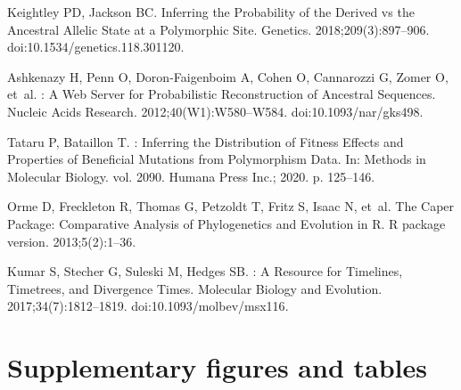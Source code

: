 \documentclass{article}
\begin{document}
\begin{thebibliography}{10}
        Keightley PD, Jackson BC.
        \newblock Inferring the Probability of the Derived vs the Ancestral Allelic
        State at a Polymorphic Site.
        \newblock Genetics. 2018;209(3):897--906.
        \newblock doi:{10.1534/genetics.118.301120}.

        Ashkenazy H, Penn O, {Doron-Faigenboim} A, Cohen O, Cannarozzi G, Zomer O,
        et~al.
        : A Web Server for Probabilistic Reconstruction of
        Ancestral Sequences.
        \newblock Nucleic Acids Research. 2012;40(W1):W580--W584.
        \newblock doi:{10.1093/nar/gks498}.

        Tataru P, Bataillon T.
        : {{Inferring}} the Distribution of Fitness Effects and
        Properties of Beneficial Mutations from Polymorphism Data.
        \newblock In: Methods in {{Molecular Biology}}. vol. 2090. Humana Press Inc.;
        2020. p. 125--146.

        Orme D, Freckleton R, Thomas G, Petzoldt T, Fritz S, Isaac N, et~al.
        \newblock The Caper Package: Comparative Analysis of Phylogenetics and
        Evolution in {{R}}.
        \newblock R package version. 2013;5(2):1--36.

        Kumar S, Stecher G, Suleski M, Hedges SB.
        : A Resource for Timelines, Timetrees, and Divergence
        Times.
        \newblock Molecular Biology and Evolution. 2017;34(7):1812--1819.
        \newblock doi:{10.1093/molbev/msx116}.

    \end{thebibliography}

    \newpage
    \section*{Supplementary figures and tables}
\end{document}
